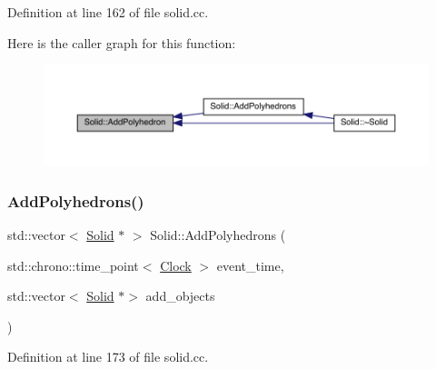 Definition at line 162 of file solid.\+cc.

Here is the caller graph for this function\+:
\nopagebreak
\begin{figure}[H]
\begin{center}
\leavevmode
\includegraphics[width=350pt]{class_solid_a87a3b588f931ff20f09a5d46f6cb7907_icgraph}
\end{center}
\end{figure}
\mbox{\label{class_solid_a649ba1103a9889bc9e45256633dc72c3}} 
\subsubsection{\texorpdfstring{Add\+Polyhedrons()}{AddPolyhedrons()}}
{\footnotesize\ttfamily std\+::vector$<$ \hyperlink{class_solid}{Solid} $\ast$ $>$ Solid\+::\+Add\+Polyhedrons (\begin{DoxyParamCaption}\item[{std\+::chrono\+::time\+\_\+point$<$ \hyperlink{universe_8h_a0ef8d951d1ca5ab3cfaf7ab4c7a6fd80}{Clock} $>$}]{event\+\_\+time,  }\item[{std\+::vector$<$ \hyperlink{class_solid}{Solid} $\ast$$>$}]{add\+\_\+objects }\end{DoxyParamCaption})}



Definition at line 173 of file solid.\+cc.

